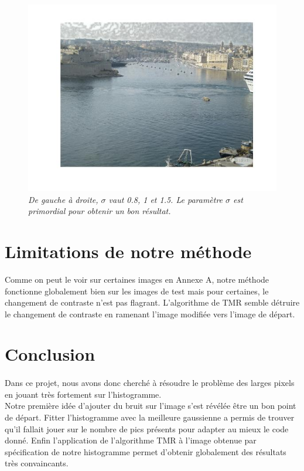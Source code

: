 \documentclass{article}
\begin{document}
\begin{figure}
\begin{minipage}{0.33\textwidth}
\end{minipage}%
\begin{minipage}{0.33\textwidth}
\centering
\includegraphics[scale=0.3]{images/malta_sigma_15.jpg}
\end{minipage}
\caption{\textit{De gauche à droite, $\sigma$ vaut 0.8, 1 et 1.5. Le paramètre $\sigma$ est primordial pour obtenir un bon résultat.}}
\end{figure}


\section*{Limitations de notre méthode}
Comme on peut le voir sur certaines images en Annexe A, notre méthode fonctionne globalement bien sur les images de test mais pour certaines, le changement de contraste n'est pas flagrant. L'algorithme de TMR semble détruire le changement de contraste en ramenant l'image modifiée vers l'image de départ.


\section*{Conclusion}
\paragraph*{}
Dans ce projet, nous avons donc cherché à résoudre le problème des larges pixels en jouant très fortement sur l'histogramme.\\
Notre première idée d'ajouter du bruit sur l'image s'est révélée être un bon point de départ. Fitter l'histogramme avec la meilleure gaussienne a permis de trouver qu'il fallait jouer sur le nombre de pics présents pour adapter au mieux le code donné. Enfin l'application de l'algorithme TMR à l'image obtenue par spécification de notre histogramme permet d'obtenir globalement des résultats très convaincants. 
\end{document}
